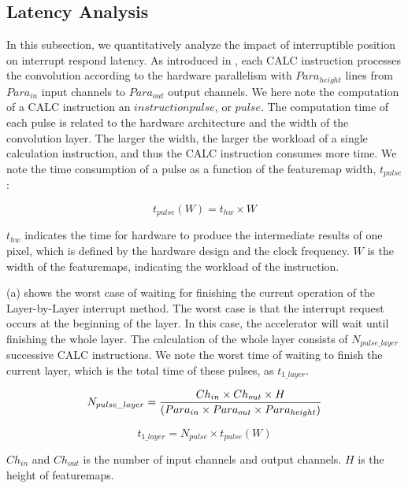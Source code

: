 \subsection {Latency Analysis}

In this subsection, we quantitatively analyze the impact of interruptible position on interrupt respond latency. 
As introduced in , each CALC  instruction processes the convolution according to the hardware parallelism with $Para_{height}$ lines from $ Para_{in} $ input channels to $ Para_{out}$ output channels. 
We here note the computation of a CALC instruction an $instruction pulse$, or $pulse$.
The computation time of each pulse is related to the hardware architecture and the width of the convolution layer. The larger the width, the larger the workload of a single calculation instruction, and thus the CALC instruction consumes more time. We note the time consumption of a pulse as a function of the featuremap width, $t_{pulse}$:

\begin{equation}
	t_{pulse}(W) = t_{hw} \times W
\end{equation}

$t_{hw}$ indicates the time for hardware to produce the intermediate results of one pixel, which is defined by the hardware design and the clock frequency. $W$ is the width of the featuremaps, indicating the workload of the instruction.

(a) shows the worst case of waiting for finishing the current operation of the Layer-by-Layer interrupt method. The worst case is that the interrupt request occurs at the beginning of the layer. In this case, the accelerator will wait until finishing the whole layer. The calculation of the whole layer consists of $N_{pulse\_layer}$ successive CALC instructions. We note the worst time of waiting to finish the current layer, which is the total time of these pulses, as $t_{1\_layer}$.

\begin{equation}
	\small
	N_{pulse\_layer} = \frac{ Ch_{in} \times Ch_{out} \times H }{ (Para_{in} \times Para_{out} \times Para_{height}) } 
\end{equation}

\begin{equation}
t_{1\_layer} = N_{pulse} \times t_{pulse}(W)
\end{equation}

$Ch_{in}$ and $Ch_{out}$ is the number of input channels and output channels. $H$ is the height of featuremaps.

